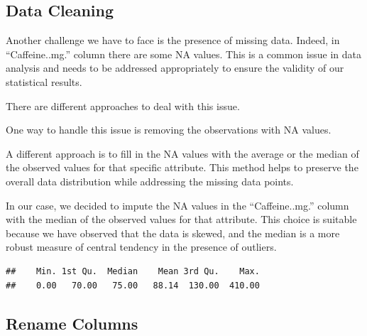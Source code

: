 \documentclass[
]{article}
\newenvironment{Shaded}{\begin{snugshade}}{\end{snugshade}}
\newcommand{\AttributeTok}[1]{\textcolor[rgb]{0.13,0.29,0.53}{#1}}
\newcommand{\ConstantTok}[1]{\textcolor[rgb]{0.56,0.35,0.01}{#1}}
\newcommand{\FunctionTok}[1]{\textcolor[rgb]{0.13,0.29,0.53}{\textbf{#1}}}
\newcommand{\NormalTok}[1]{#1}
\newcommand{\OtherTok}[1]{\textcolor[rgb]{0.56,0.35,0.01}{#1}}
\newcommand{\SpecialCharTok}[1]{\textcolor[rgb]{0.81,0.36,0.00}{\textbf{#1}}}
\begin{document}
\subsection{Data Cleaning}\label{data-cleaning}

Another challenge we have to face is the presence of missing data.
Indeed, in ``Caffeine..mg.'' column there are some NA values. This is a
common issue in data analysis and needs to be addressed appropriately to
ensure the validity of our statistical results.

There are different approaches to deal with this issue.

One way to handle this issue is removing the observations with NA
values.

A different approach is to fill in the NA values with the average or the
median of the observed values for that specific attribute. This method
helps to preserve the overall data distribution while addressing the
missing data points.

In our case, we decided to impute the NA values in the ``Caffeine..mg.''
column with the median of the observed values for that attribute. This
choice is suitable because we have observed that the data is skewed, and
the median is a more robust measure of central tendency in the presence
of outliers.

\begin{Shaded}
\end{Shaded}

\begin{verbatim}
##    Min. 1st Qu.  Median    Mean 3rd Qu.    Max. 
##    0.00   70.00   75.00   88.14  130.00  410.00
\end{verbatim}

\subsection{Rename Columns}\label{rename-columns}
\end{document}
